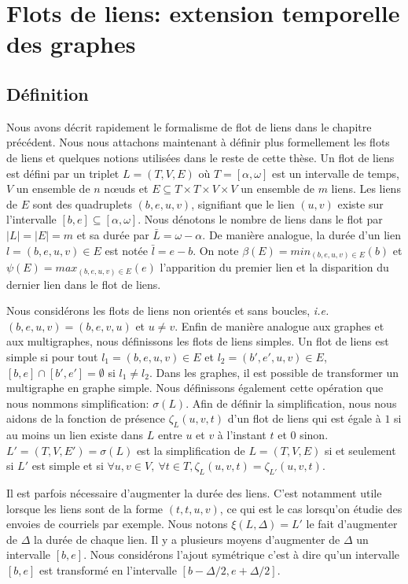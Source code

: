 \chapter{Flots de liens: extension temporelle des graphes}
\minitoc
\label{chap:def_flot}

\section{Définition}
\label{sec:definition}

Nous avons décrit rapidement le formalisme de flot de liens dans le chapitre précédent.
Nous nous attachons maintenant à définir plus formellement les flots de liens et quelques notions utilisées dans le reste de cette thèse.
Un flot de liens est défini par un triplet $L=(T,V,E)$ où $T=[\alpha, \omega]$ est un intervalle de temps, $V$ un ensemble de $n$ n\oe{}uds et $E\subseteq T\times T \times V \times V$ un ensemble de $m$ liens.
Les liens de $E$ sont des quadruplets $(b,e,u,v)$, signifiant que le lien $(u, v)$ existe sur l'intervalle $[b,e] \subseteq [\alpha,\omega]$.
Nous dénotons le nombre de liens dans le flot par $|L|=|E|=m$ et sa durée par $\bar{L}=\omega-\alpha$.
De manière analogue, la durée d'un lien $l=(b,e,u,v) \in E$ est notée   $\bar{l}=e-b$.
On note $\beta(E)= min_{(b,e,u,v) \in E} (b)$ et $\psi(E)= max_{(b,e,u,v) \in E} (e)$ l'apparition du premier lien et la disparition du dernier lien dans le flot de liens.

Nous considérons les flots de liens non orientés et sans boucles, \emph{i.e.}$(b,e,u,v)=(b,e,v,u)$ et $u \neq v$.
Enfin de manière analogue aux graphes et aux multigraphes, nous définissons les flots de liens simples.
Un flot de liens est simple si pour tout $l_1=(b,e,u,v) \in E$ et $l_2=(b',e',u, v) \in E$, $[b,e]\cap [b', e'] = \emptyset$ si $l_1 \neq l_2$.
Dans les graphes, il est possible de transformer un multigraphe en graphe simple.
Nous définissons également cette opération que nous nommons simplification: $\sigma(L)$.
Afin de définir la simplification, nous nous aidons de la fonction de présence $\zeta_{L}(u,v,t)$ d'un flot de liens qui est égale à $1$ si au moins un lien existe dans $L$ entre $u$ et $v$ à l'instant $t$ et $0$ sinon.
$L'=(T,V,E')= \sigma(L)$ est la simplification de $L=(T,V,E)$ si et seulement si $L'$ est simple et si $\forall u,v \in V,\ \forall t\in T, \zeta_{L}(u,v,t)= \zeta_{L'}(u,v,t)$.

Il est parfois nécessaire d'augmenter la durée des liens.
C'est notamment utile lorsque les liens sont de la forme $(t,t,u,v)$, ce qui est le cas lorsqu'on étudie des envoies de courriels par exemple.
Nous notons $\xi(L,\Delta)=L'$ le fait d'augmenter de $\Delta$ la durée de chaque lien.
Il y a plusieurs moyens d'augmenter de $\Delta$ un intervalle $[b,e]$.
Nous considérons l'ajout symétrique c'est à dire qu'un intervalle $[b,e]$ est transformé en l'intervalle $[b-\Delta/2,e+\Delta/2]$.

